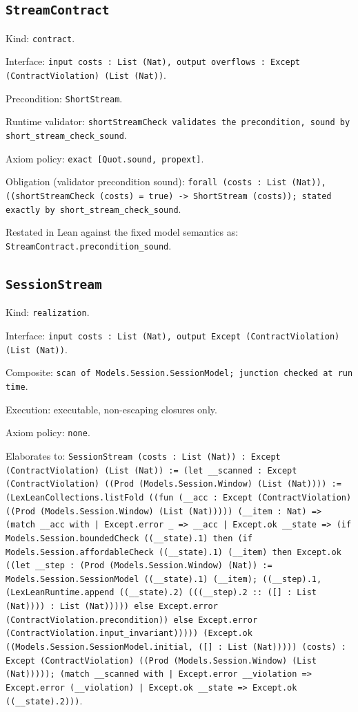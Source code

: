 \documentclass[11pt]{article}
\begin{document}
\subsection*{\texttt{StreamContract}}
\noindent Kind: \texttt{contract}.\par
\noindent Interface: \texttt{input costs : List (Nat), output overflows : Except (ContractViolation) (List (Nat))}.\par
\noindent Precondition: \texttt{ShortStream}.\par
\noindent Runtime validator: \texttt{shortStreamCheck validates the precondition, sound by short\_stream\_check\_sound}.\par
\noindent Axiom policy: \texttt{exact [Quot.sound, propext]}.\par
\noindent Obligation (validator precondition sound): \texttt{forall (costs : List (Nat)), ((shortStreamCheck (costs) = true) -> ShortStream (costs)); stated exactly by short\_stream\_check\_sound}.\par
\noindent Restated in Lean against the fixed model semantics as: \texttt{StreamContract.precondition\_sound}.\par
\subsection*{\texttt{SessionStream}}
\noindent Kind: \texttt{realization}.\par
\noindent Interface: \texttt{input costs : List (Nat), output Except (ContractViolation) (List (Nat))}.\par
\noindent Composite: \texttt{scan of Models.Session.SessionModel; junction checked at run time}.\par
\noindent Execution: executable, non-escaping closures only.\par
\noindent Axiom policy: \texttt{none}.\par
\noindent Elaborates to: \texttt{SessionStream (costs : List (Nat)) : Except (ContractViolation) (List (Nat)) := (let \_\_scanned : Except (ContractViolation) ((Prod (Models.Session.Window) (List (Nat)))) := (LexLeanCollections.listFold ((fun (\_\_acc : Except (ContractViolation) ((Prod (Models.Session.Window) (List (Nat))))) (\_\_item : Nat) => (match \_\_acc with | Except.error \_ => \_\_acc | Except.ok \_\_state => (if Models.Session.boundedCheck ((\_\_state).1) then (if Models.Session.affordableCheck ((\_\_state).1) (\_\_item) then Except.ok ((let \_\_step : (Prod (Models.Session.Window) (Nat)) := Models.Session.SessionModel ((\_\_state).1) (\_\_item); ((\_\_step).1, (LexLeanRuntime.append ((\_\_state).2) (((\_\_step).2 :: ([] : List (Nat)))) : List (Nat))))) else Except.error (ContractViolation.precondition)) else Except.error (ContractViolation.input\_invariant))))) (Except.ok ((Models.Session.SessionModel.initial, ([] : List (Nat))))) (costs) : Except (ContractViolation) ((Prod (Models.Session.Window) (List (Nat))))); (match \_\_scanned with | Except.error \_\_violation => Except.error (\_\_violation) | Except.ok \_\_state => Except.ok ((\_\_state).2)))}.\par
\end{document}

